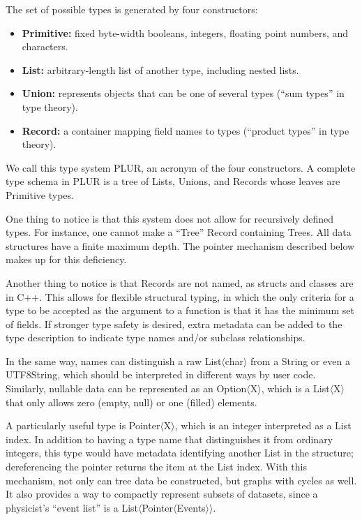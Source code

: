 \documentclass[10pt, conference, compsocconf]{IEEEtran}
\begin{document}
The set of possible types is generated by four constructors:
\begin{itemize}
\item {\bf Primitive:} fixed byte-width booleans, integers, floating point numbers, and characters.
\item {\bf List:} arbitrary-length list of another type, including nested lists.
\item {\bf Union:} represents objects that can be one of several types (``sum types'' in type theory).
\item {\bf Record:} a container mapping field names to types (``product types'' in type theory).
\end{itemize}
We call this type system PLUR, an acronym of the four constructors. A complete type schema in PLUR is a tree of Lists, Unions, and Records whose leaves are Primitive types.

One thing to notice is that this system does not allow for recursively defined types. For instance, one cannot make a ``Tree'' Record containing Trees. All data structures have a finite maximum depth. The pointer mechanism described below makes up for this deficiency.

Another thing to notice is that Records are not named, as structs and classes are in C++. This allows for flexible structural typing, in which the only criteria for a type to be accepted as the argument to a function is that it has the minimum set of fields. If stronger type safety is desired, extra metadata can be added to the type description to indicate type names and/or subclass relationships.

In the same way, names can distinguish a raw List$\langle$char$\rangle$ from a String or even a UTF8String, which should be interpreted in different ways by user code. Similarly, nullable data can be represented as an Option$\langle$X$\rangle$, which is a List$\langle$X$\rangle$ that only allows zero (empty, null) or one (filled) elements.

A particularly useful type is Pointer$\langle$X$\rangle$, which is an integer interpreted as a List index. In addition to having a type name that distinguishes it from ordinary integers, this type would have metadata identifying another List in the structure; dereferencing the pointer returns the item at the List index. With this mechanism, not only can tree data be constructed, but graphs with cycles as well. It also provides a way to compactly represent subsets of datasets, since a physicist's ``event list'' is a List$\langle$Pointer$\langle$Events$\rangle\rangle$.
\end{document}

